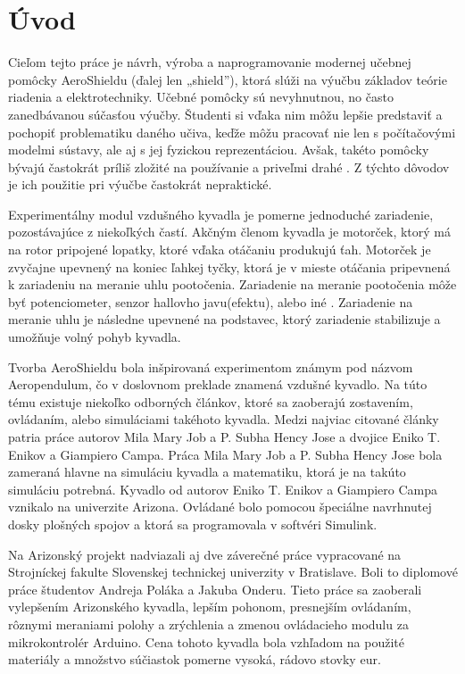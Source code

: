 \chapter*{Úvod}
\label{UVOD}

Cieľom tejto práce je návrh, výroba a naprogramovanie modernej učebnej pomôcky AeroShieldu (ďalej len „shield”), ktorá slúži na výučbu základov teórie riadenia a elektrotechniky. Učebné pomôcky sú nevyhnutnou, no často zanedbávanou súčasťou výučby. Študenti si vďaka nim môžu lepšie predstaviť a pochopiť problematiku daného učiva, keďže môžu pracovať nie len s počítačovými modelmi sústavy, ale aj s jej fyzickou reprezentáciou. Avšak, takéto pomôcky bývajú častokrát príliš zložité na používanie a priveľmi drahé \cite{Hor}. Z týchto dôvodov je ich použitie pri výučbe častokrát nepraktické.
 
Experimentálny modul vzdušného kyvadla je pomerne jednoduché zariadenie, pozostávajúce z niekoľkých častí. Akčným členom kyvadla je motorček, ktorý má na rotor pripojené lopatky, ktoré vďaka otáčaniu produkujú ťah. Motorček je zvyčajne upevnený na koniec ľahkej tyčky, ktorá je v mieste otáčania pripevnená k zariadeniu na meranie uhlu pootočenia. Zariadenie na meranie pootočenia môže byť potenciometer, senzor hallovho javu(efektu), alebo iné \cite{senzor}. Zariadenie na meranie uhlu je následne upevnené na podstavec, ktorý zariadenie stabilizuje a umožňuje volný pohyb kyvadla. 
 
Tvorba AeroShieldu bola inšpirovaná experimentom známym pod názvom Aeropendulum, čo v doslovnom preklade znamená vzdušné kyvadlo. Na túto tému existuje niekoľko odborných článkov, ktoré sa zaoberajú zostavením, ovládaním, alebo simuláciami takéhoto kyvadla. Medzi najviac citované články patria práce autorov Mila Mary Job a P. Subha Hency Jose\cite{7192959} a dvojice Eniko T. Enikov a Giampiero Campa\cite{enikov_campa_2012}. Práca Mila Mary Job a P. Subha Hency Jose bola zameraná hlavne na simuláciu kyvadla a matematiku, ktorá je na takúto simuláciu potrebná. Kyvadlo od autorov Eniko T. Enikov a Giampiero Campa vznikalo na univerzite Arizona. Ovládané bolo pomocou špeciálne navrhnutej dosky plošných spojov a ktorá sa programovala v softvéri Simulink. 

Na Arizonský projekt nadviazali aj dve záverečné práce vypracované na Strojníckej fakulte Slovenskej technickej univerzity v Bratislave. Boli to diplomové práce študentov Andreja Poláka\cite{Polak} a Jakuba Onderu\cite{Ondera}. Tieto práce sa zaoberali vylepšením Arizonského kyvadla, lepším pohonom, presnejším ovládaním, rôznymi meraniami polohy a zrýchlenia a zmenou ovládacieho modulu za mikrokontrolér Arduino. Cena tohoto kyvadla bola vzhľadom na použité materiály a množstvo súčiastok pomerne vysoká, rádovo stovky eur. 

